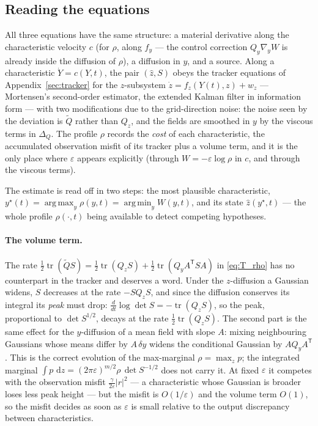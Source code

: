 \documentclass[11pt,a4paper]{article}
\newcommand{\dd}{\,\mathrm{d}}
\newcommand{\tr}{\operatorname{tr}}
\newcommand{\argmin}{\operatorname{arg\,min}}
\newcommand{\argmax}{\operatorname{arg\,max}}
\newcommand{\T}{^{\mathsf T}}
\newcommand{\zh}{\hat{z}}
\newcommand{\eps}{\varepsilon}
\newcommand{\abs}[1]{\left\lvert #1 \right\rvert}
\newcommand{\gy}{\nabla_{\!y}}
\theoremstyle{plain}
\theoremstyle{definition}
\theoremstyle{remark}
\begin{document}
\subsection{Reading the equations}

All three equations have the same structure: a material derivative along the characteristic velocity $c$ (for $\rho$, along $f_y$ --- the control correction $Q_y\gy W$ is already inside the diffusion of $\rho$), a diffusion in $y$, and a source. Along a characteristic $\dot Y = c(Y,t)$, the pair $(\zh,S)$ obeys the tracker equations of Appendix~\ref{sec:tracker} for the $z$-subsystem $\dot z = f_z(Y(t),z)+w_z$ --- Mortensen's second-order estimator, the extended Kalman filter in information form --- with two modifications due to the grid-direction noise: the noise seen by the deviation is $\tilde Q$ rather than $Q_z$, and the fields are smoothed in $y$ by the viscous terms in $\Delta_Q$. The profile $\rho$ records the \emph{cost} of each characteristic, the accumulated observation misfit of its tracker plus a volume term, and it is the only place where $\eps$ appears explicitly (through $W=-\eps\log\rho$ in $c$, and through the viscous terms).

The estimate is read off in two steps: the most plausible characteristic, $y^\star(t) = \argmax_y\rho(y,t) = \argmin_yW(y,t)$, and its state $\zh(y^\star,t)$ --- the whole profile $\rho(\cdot,t)$ being available to detect competing hypotheses.

\paragraph{The volume term.}
The rate $\tfrac12\tr(\tilde QS) = \tfrac12\tr(Q_zS) + \tfrac12\tr(Q_yA\T SA)$ in \eqref{eq:T_rho} has no counterpart in the tracker and deserves a word. Under the $z$-diffusion a Gaussian widens, $S$ decreases at the rate $-SQ_zS$, and since the diffusion conserves its integral its \emph{peak} must drop: $\tfrac{d}{dt}\log\det S = -\tr(Q_zS)$, so the peak, proportional to $\det S^{1/2}$, decays at the rate $\tfrac12\tr(Q_zS)$. The second part is the same effect for the $y$-diffusion of a mean field with slope $A$: mixing neighbouring Gaussians whose means differ by $A\,\delta y$ widens the conditional Gaussian by $AQ_yA\T$. This is the correct evolution of the max-marginal $\rho=\max_zp$; the integrated marginal $\int p\,\dd z = (2\pi\eps)^{m/2}\rho\,\det S^{-1/2}$ does not carry it. At fixed $\eps$ it competes with the observation misfit $\tfrac{\gamma}{2\eps}\abs r^2$ --- a characteristic whose Gaussian is broader loses less peak height --- but the misfit is $O(1/\eps)$ and the volume term $O(1)$, so the misfit decides as soon as $\eps$ is small relative to the output discrepancy between characteristics.
\end{document}
